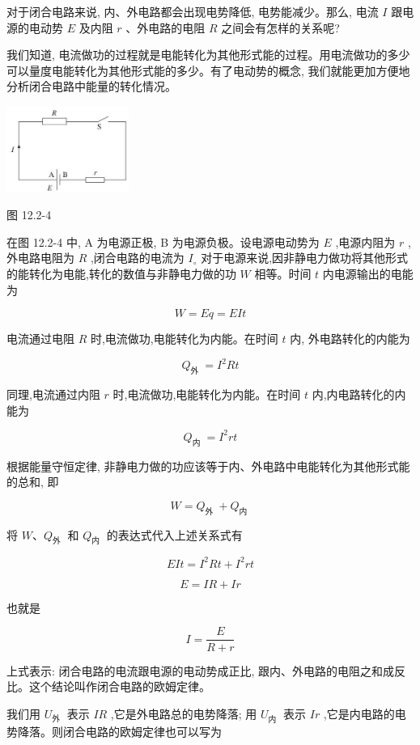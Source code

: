 \documentclass[10pt]{article}
\begin{document}
对于闭合电路来说, 内、外电路都会出现电势降低, 电势能减少。那么, 电流 \(I\) 跟电源的电动势 \(E\) 及内阻 \(r\) 、外电路的电阻 \(R\) 之间会有怎样的关系呢?

我们知道, 电流做功的过程就是电能转化为其他形式能的过程。用电流做功的多少可以量度电能转化为其他形式能的多少。有了电动势的概念, 我们就能更加方便地分析闭合电路中能量的转化情况。

\begin{center}
\includegraphics[max width=0.3\textwidth]{images/01911d5f-8e38-70c0-b5b8-2b399bd115b6_90_957961.jpg}
\end{center}

图 12.2-4

在图 12.2-4 中, A 为电源正极, B 为电源负极。设电源电动势为 \(E\) ,电源内阻为 \(r\) ,外电路电阻为 \(R\) ,闭合电路的电流为 \({I}_{ \circ }\) 对于电源来说,因非静电力做功将其他形式的能转化为电能,转化的数值与非静电力做的功 \(W\) 相等。时间 \(t\) 内电源输出的电能为

\[
W = {Eq} = {EIt}
\]

电流通过电阻 \(R\) 时,电流做功,电能转化为内能。在时间 \(t\) 内, 外电路转化的内能为

\[
{Q}_{\text{外 }} = {I}^{2}{Rt}
\]

同理,电流通过内阻 \(r\) 时,电流做功,电能转化为内能。在时间 \(t\) 内,内电路转化的内能为

\[
{Q}_{\text{内 }} = {I}^{2}{rt}
\]

根据能量守恒定律, 非静电力做的功应该等于内、外电路中电能转化为其他形式能的总和, 即

\[
W = {Q}_{\text{外 }} + {Q}_{\text{内 }}
\]

将 \(W\text{、}{Q}_{\text{外 }}\) 和 \({Q}_{\text{内 }}\) 的表达式代入上述关系式有

\[
{EIt} = {I}^{2}{Rt} + {I}^{2}{rt}
\]

\[
E = {IR} + {Ir}
\]

也就是

\[
I = \frac{E}{R + r} \tag{1}
\]

上式表示: 闭合电路的电流跟电源的电动势成正比, 跟内、外电路的电阻之和成反比。这个结论叫作闭合电路的欧姆定律。

我们用 \({U}_{\text{外 }}\) 表示 \({IR}\) ,它是外电路总的电势降落; 用 \({U}_{\text{内 }}\) 表示 \({Ir}\) ,它是内电路的电势降落。则闭合电路的欧姆定律也可以写为
\end{document}

